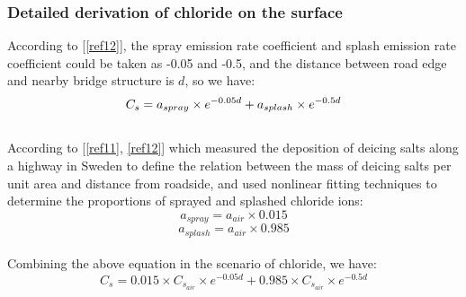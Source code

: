 \documentclass[12pt]{article}
\newcommand{\reref}[1]{\ref{#1}}
\begin{document}
\subsubsection*{Detailed derivation of chloride on the surface}
According to [\reref{ref12}], the spray emission rate coefficient and splash emission rate coefficient could be taken as -0.05 and -0.5, and the distance between road edge and nearby bridge structure is $d$, so we have: 
\[
C_s = a_{spray} \times e^{-0.05d} + a_{splash} \times e^{-0.5d}\\ 
\]
\\
According to [\reref{ref11}, \reref{ref12}] which measured the deposition of deicing salts along a highway in Sweden to define the relation between the mass of deicing salts per unit area and distance from roadside, and used nonlinear fitting techniques to determine the proportions of sprayed and splashed chloride ions:
\[
a_{spray} = a_{air} \times 0.015
\]
\[
a_{splash} = a_{air} \times 0.985
\]
\\
Combining the above equation in the scenario of chloride, we have:
\[
C_s = 0.015 \times C_{s_{air}} \times e^{-0.05d} + 0.985 \times C_{s_{air}} \times  e^{-0.5d}
\]


~\newline
\end{document}
